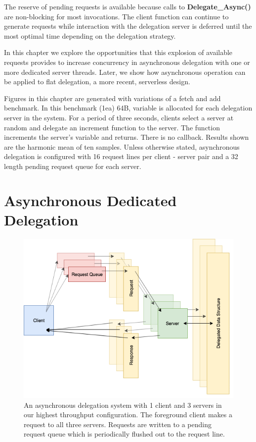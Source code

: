 \documentclass{uicthesi}
\begin{document}
The reserve of pending requests is available because calls to \textbf{Delegate\_Async()} are non-blocking for most invocations. The client function can continue to generate requests while interaction with the delegation server is deferred until the most optimal time depending on the delegation strategy. 

In this chapter we explore the opportunities that this explosion of available requests provides to increase concurrency in asynchronous delegation with one or more dedicated server threads. Later, we show how asynchronous operation can be applied to flat delegation, a more recent, serverless design. 

Figures in this chapter are generated with variations of a fetch and add benchmark. In this benchmark (1ea) 64B, variable is allocated for each delegation server in the system. For a period of three seconds, clients select a server at random and delegate an increment function to the server. The function increments the server's variable and returns. There is no callback. Results shown are the harmonic mean of ten samples. Unless otherwise stated, asynchronous delegation is configured with 16 request lines per client - server pair and a 32 length pending request queue for each server.  

\section{Asynchronous Dedicated Delegation}
\begin{figure}[ht!]
\centering
\includegraphics[width=0.9\columnwidth]{FIG/dedicated_async.png}
\caption{An asynchronous delegation system with 1 client and 3 servers in our highest throughput configuration. The foreground client makes a request to all three servers. Requests are written to a pending request queue which is periodically flushed out to the request line. }
\label{fig:dedicated_delegation}
\end{figure}
\end{document}
